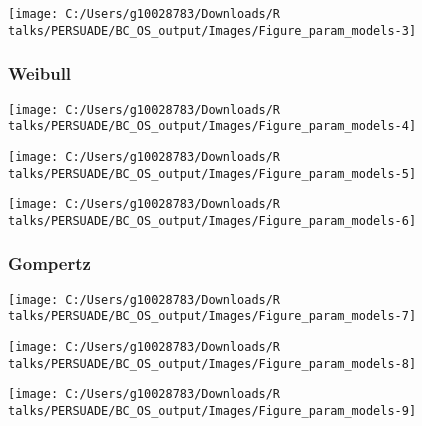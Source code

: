 \documentclass[
]{article}
\begin{document}
\begin{flushleft}\texttt{[image: C:/Users/g10028783/Downloads/R talks/PERSUADE/BC\_OS\_output/Images/Figure\_param\_models-3]} \end{flushleft}

\clearpage

\subsubsection{Weibull}\label{weibull}

\begin{flushleft}\texttt{[image: C:/Users/g10028783/Downloads/R talks/PERSUADE/BC\_OS\_output/Images/Figure\_param\_models-4]} \end{flushleft}

\begin{flushleft}\texttt{[image: C:/Users/g10028783/Downloads/R talks/PERSUADE/BC\_OS\_output/Images/Figure\_param\_models-5]} \end{flushleft}

\begin{flushleft}\texttt{[image: C:/Users/g10028783/Downloads/R talks/PERSUADE/BC\_OS\_output/Images/Figure\_param\_models-6]} \end{flushleft}

\clearpage

\subsubsection{Gompertz}\label{gompertz}

\begin{flushleft}\texttt{[image: C:/Users/g10028783/Downloads/R talks/PERSUADE/BC\_OS\_output/Images/Figure\_param\_models-7]} \end{flushleft}

\begin{flushleft}\texttt{[image: C:/Users/g10028783/Downloads/R talks/PERSUADE/BC\_OS\_output/Images/Figure\_param\_models-8]} \end{flushleft}

\begin{flushleft}\texttt{[image: C:/Users/g10028783/Downloads/R talks/PERSUADE/BC\_OS\_output/Images/Figure\_param\_models-9]} \end{flushleft}

\clearpage
\end{document}
